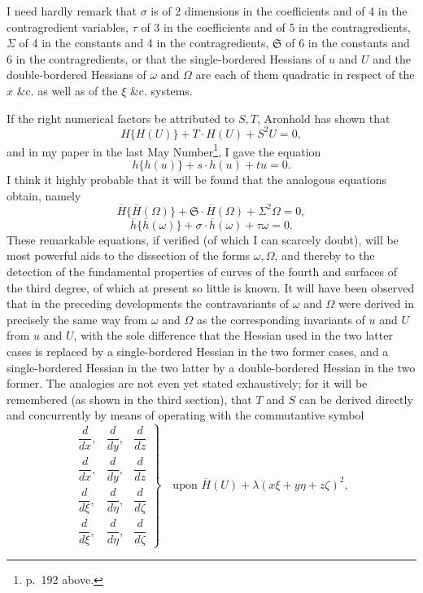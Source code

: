 \documentclass[11pt]{article}
\begin{document}
{{I need hardly remark that $\sigma$ is of 2 dimensions in the coefficients and of 4 in the contragredient variables, $\tau$ of 3 in the coefficients and of 5 in the contragredients, $\Sigma$ of 4 in the constants and 4 in the contragredients, $\mathfrak{S}$ of 6 in the constants and 6 in the contragredients, or that the single-bordered Hessians of $u$ and $U$ and the double-bordered Hessians of $\omega$ and $\Omega$ are each of them quadratic in respect of the $x$ \&c. as well as of the $\xi$ \&c. systems.

If the right numerical factors be attributed to $S,T$, Aronhold has shown that
\[
H\{H(U)\}+T\cdot H(U)+S^2U=0,
\]
and in my paper in the last May Number\footnote{p.~192 above.}, I gave the equation
\[
h\{h(u)\}+s\cdot h(u)+tu=0.
\]
I think it highly probable that it will be found that the analogous equations obtain, namely
\[
\overline H\{\overline H(\Omega)\}
+\mathfrak{S}\cdot\overline H(\Omega)+\Sigma^2\Omega=0,
\]
\[
\overline h\{\overline h(\omega)\}+\sigma\cdot\overline h(\omega)+\tau\omega=0.
\]
These remarkable equations, if verified (of which I can scarcely doubt), will be most powerful aids to the dissection of the forms $\omega,\Omega$, and thereby to the detection of the fundamental properties of curves of the fourth and surfaces of the third degree, of which at present so little is known. It will have been observed that in the preceding developments the contravariants of $\omega$ and $\Omega$ were derived in precisely the same way from $\omega$ and $\Omega$ as the corresponding invariants of $u$ and $U$ from $u$ and $U$, with the sole difference that the Hessian used in the two latter cases is replaced by a single-bordered Hessian in the two former cases, and a single-bordered Hessian in the two latter by a double-bordered Hessian in the two former. The analogies are not even yet stated exhaustively; for it will be remembered (as shown in the third section), that $T$ and $S$ can be derived directly and concurrently by means of operating with the commutantive symbol
\[
\left.
\begin{matrix}
\dfrac{d}{dx},&\dfrac{d}{dy},&\dfrac{d}{dz}\\
\dfrac{d}{dx},&\dfrac{d}{dy},&\dfrac{d}{dz}\\
\dfrac{d}{d\xi},&\dfrac{d}{d\eta},&\dfrac{d}{d\zeta}\\
\dfrac{d}{d\xi},&\dfrac{d}{d\eta},&\dfrac{d}{d\zeta}
\end{matrix}
\right\}
\quad\text{upon }\overline H(U)+\lambda(x\xi+y\eta+z\zeta)^2,
\]

}}
\end{document}

